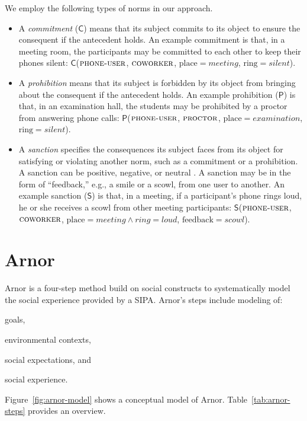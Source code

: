 \documentclass[11pt,          %
               phd,           %
               onehalfspacing %
               ]{ncsuthesis}
\newcommand{\fsc}{\textsc}
\newcommand{\msf}{\mathsf}
\newcommand{\C}{\msf{C}}
\newcommand{\Pro}{\msf{P}}
\newcommand{\San}{\msf{S}}
\newcommand{\frameworkA}{Arnor\xspace}
\begin{document}
We employ the following types of norms in our approach. 
\begin{itemize}

\item A \emph{commitment} ($\C$) means that its subject commits to its
object to ensure the consequent if the antecedent holds. An example
commitment is that, in a meeting room, the participants may be committed
to each other to keep their phones silent: $\C$($\fsc{phone-user}$,
$\fsc{coworker}$, $\text{place}=meeting$, $\text{ring}=silent$).

\item A \emph{prohibition} means that its subject is forbidden by its
object from bringing about the consequent if the antecedent holds. An
example prohibition ($\Pro$) is that, in an examination hall, the
students may be prohibited by a proctor from answering phone calls:
$\Pro$($\fsc{phone-user}$, $\fsc{proctor}$, $\text{place}=examination$,
$\text{ring}=silent$).

\item A \emph{sanction} specifies the consequences its subject faces
from its object for satisfying or violating another norm, such as a
commitment or a prohibition. A sanction can be positive, negative, or
neutral \citep{Nardin-KER16-Classifying}. A sanction may be in the form
of ``feedback,'' e.g., a smile or a scowl, from one user to another. An
example sanction ($\San$) is that, in a meeting, if a participant's
phone rings loud, he or she receives a scowl from other meeting
participants: $\San$($\fsc{phone-user}$, $\fsc{coworker}$,
$\text{place}=meeting \land ring=loud$, $\text{feedback}=scowl$).

\end{itemize} 

\section{\frameworkA}
\label{sec:arnor-framework}

\frameworkA is a four-step method build on social constructs to systematically model the social 
experience provided by a SIPA. \frameworkA's steps include modeling of: 
\begin{enumerate*}[label=(\arabic*)]
\item goals, 
\item environmental contexts,
\item social expectations, and 
\item social experience. 
\end{enumerate*}
Figure~\ref{fig:arnor-model} shows a conceptual model of 
\frameworkA.  Table~\ref{tab:arnor-steps} provides an overview. 
\end{document}
